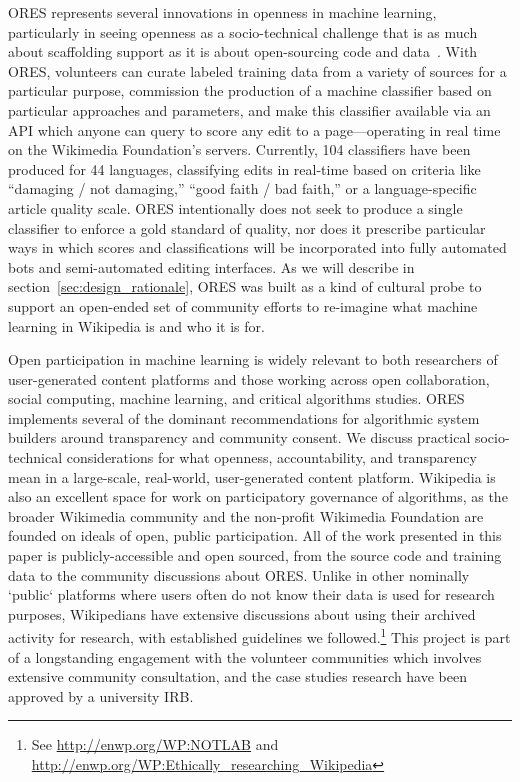 ORES represents several innovations in openness in machine learning, particularly in seeing openness as a socio-technical challenge that is as much about scaffolding support as it is about open-sourcing code and data~\cite{selbst2019fairness}. With ORES, volunteers can curate labeled training data from a variety of sources for a particular purpose, commission the production of a machine classifier based on particular approaches and parameters, and make this classifier available via an API which anyone can query to score any edit to a page---operating in real time on the Wikimedia Foundation's servers. Currently, 104 classifiers have been produced for 44 languages, classifying edits in real-time based on criteria like ``damaging / not damaging,'' ``good faith / bad faith,'' or a language-specific article quality scale. ORES intentionally does not seek to produce a single classifier to enforce a gold standard of quality, nor does it prescribe particular ways in which scores and classifications will be incorporated into fully automated bots and semi-automated editing interfaces. As we will describe in section~\ref{sec:design_rationale}, ORES was built as a kind of cultural probe \cite{hutchinson2003technology} to support an open-ended set of community efforts to re-imagine what machine learning in Wikipedia is and who it is for.

Open participation in machine learning is widely relevant to both researchers of user-generated content platforms and those working across open collaboration, social computing, machine learning, and critical algorithms studies. ORES implements several of the dominant recommendations for algorithmic system builders around transparency and community consent\cite{crawford2016algorithm,diakopoulos2015algorithmic,sandvig2014auditing}. We discuss practical socio-technical considerations for what openness, accountability, and transparency mean in a large-scale, real-world, user-generated content platform. Wikipedia is also an excellent space for work on participatory governance of algorithms, as the broader Wikimedia community and the non-profit Wikimedia Foundation are founded on ideals of open, public participation. All of the work presented in this paper is publicly-accessible and open sourced, from the source code and training data to the community discussions about ORES. Unlike in other nominally `public` platforms where users often do not know their data is used for research purposes, Wikipedians have extensive discussions about using their archived activity for research, with established guidelines we followed.\footnote{See \url{http://enwp.org/WP:NOTLAB} and \url{http://enwp.org/WP:Ethically_researching_Wikipedia}} This project is part of a longstanding engagement with the volunteer communities which involves extensive community consultation, and the case studies research have been approved by a university IRB.

